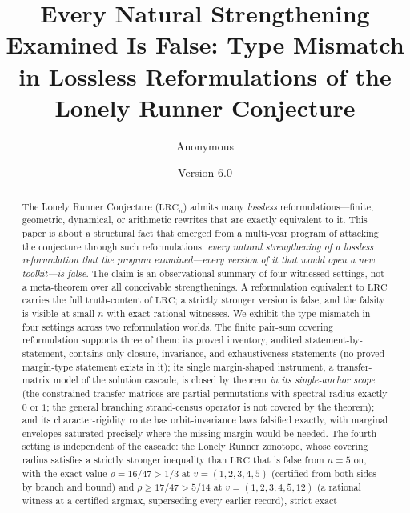 \documentclass[11pt,a4paper]{article}
\numberwithin{equation}{section}
\theoremstyle{plain}
\theoremstyle{definition}
\theoremstyle{remark}
\newcommand{\lrc}{\mathrm{LRC}}
\newcommand{\papertitle}{Every Natural Strengthening Examined Is False: Type Mismatch
in Lossless Reformulations of the Lonely Runner Conjecture}
\begin{document}
\title{\papertitle}
\author{Anonymous}
\date{Version 6.0}
\maketitle

\tableofcontents
\clearpage


\begin{abstract}
\noindent
The Lonely Runner Conjecture ($\lrc_n$) admits many \emph{lossless}
reformulations---finite, geometric, dynamical, or arithmetic rewrites that
are exactly equivalent to it. This paper is about a structural fact that
emerged from a multi-year program of attacking the conjecture through such
reformulations: \emph{every natural strengthening of a lossless
reformulation that the program examined---every version of it that would
open a new toolkit---is false}. The claim is an observational summary of
four witnessed settings, not a meta-theorem over all conceivable
strengthenings. A reformulation equivalent to $\lrc$ carries the full
truth-content of $\lrc$; a strictly stronger version is false, and the
falsity is visible at small $n$ with exact rational witnesses. We exhibit
the type mismatch in four settings across two reformulation worlds. The
finite pair-sum covering reformulation supports three of them: its proved
inventory, audited statement-by-statement, contains only closure,
invariance, and exhaustiveness statements (no proved margin-type statement
exists in it); its single margin-shaped instrument, a transfer-matrix
model of the solution cascade, is closed by theorem \emph{in its
single-anchor scope} (the constrained transfer matrices are partial
permutations with spectral radius exactly $0$ or $1$; the general
branching strand-census operator is not covered by the theorem); and its
character-rigidity route has orbit-invariance laws falsified exactly, with
marginal envelopes saturated precisely where the missing margin would be
needed. The fourth setting is independent of the
cascade: the Lonely Runner zonotope, whose covering radius satisfies a
strictly stronger inequality than $\lrc$ that is false from $n=5$ on,
with the exact value $\rho=16/47>1/3$ at
$v=(1,2,3,4,5)$ (certified from both sides by branch and bound) and
$\rho\ge17/47>5/14$ at $v=(1,2,3,4,5,12)$ (a rational witness at a
certified argmax, superseding every earlier record), strict exact

\end{abstract}
\end{document}
